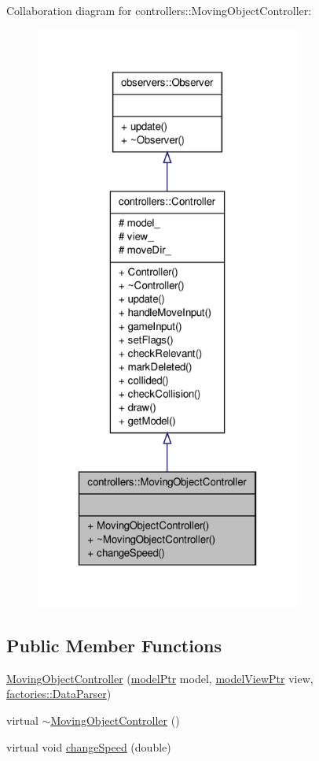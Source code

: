 \-Collaboration diagram for controllers\-:\-:\-Moving\-Object\-Controller\-:
\nopagebreak
\begin{figure}[H]
\begin{center}
\leavevmode
\includegraphics[height=550pt]{d6/d5d/classcontrollers_1_1MovingObjectController__coll__graph}
\end{center}
\end{figure}
\subsection*{\-Public \-Member \-Functions}
\begin{DoxyCompactItemize}
\item 
\hyperlink{classcontrollers_1_1MovingObjectController_ae863528f0cefcef797eae0e6c2a03001}{\-Moving\-Object\-Controller} (\hyperlink{ModelView_8h_a78966ddb517fca8d2b29a2bc5c31e74e}{model\-Ptr} model, \hyperlink{Controller_8h_a8ca0a41a38eb52be242997413482c0cf}{model\-View\-Ptr} view, \hyperlink{classfactories_1_1DataParser}{factories\-::\-Data\-Parser})
\item 
virtual \hyperlink{classcontrollers_1_1MovingObjectController_a0ce7dd8eedbc7fa941d01d00d4d0b891}{$\sim$\-Moving\-Object\-Controller} ()
\item 
virtual void \hyperlink{classcontrollers_1_1MovingObjectController_a956742fda341b3b1588004fd9cde3e24}{change\-Speed} (double)
\end{DoxyCompactItemize}


